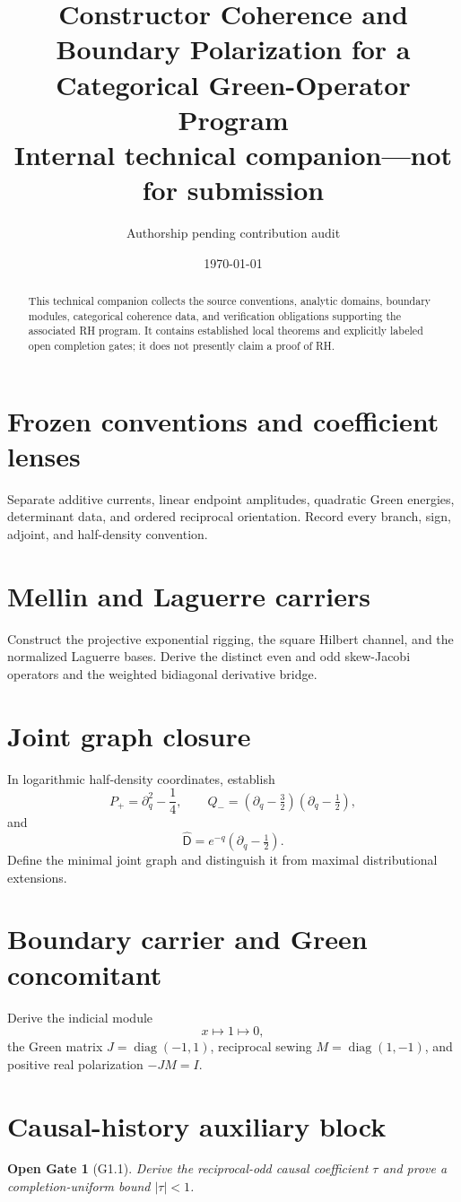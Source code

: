\documentclass[11pt]{article}
\title{Constructor Coherence and Boundary Polarization for a Categorical Green-Operator Program\\
\large Internal technical companion---not for submission}
\author{Authorship pending contribution audit}
\date{\today}
\newtheorem{gate}[theorem]{Open Gate}
\begin{document}
\maketitle
\begin{abstract}
This technical companion collects the source conventions, analytic domains, boundary modules, categorical coherence data, and verification obligations supporting the associated RH program. It contains established local theorems and explicitly labeled open completion gates; it does not presently claim a proof of RH.
\end{abstract}

\section{Frozen conventions and coefficient lenses}
Separate additive currents, linear endpoint amplitudes, quadratic Green energies, determinant data, and ordered reciprocal orientation. Record every branch, sign, adjoint, and half-density convention.

\section{Mellin and Laguerre carriers}
Construct the projective exponential rigging, the square Hilbert channel, and the normalized Laguerre bases. Derive the distinct even and odd skew-Jacobi operators and the weighted bidiagonal derivative bridge.

\section{Joint graph closure}
In logarithmic half-density coordinates, establish
\[
P_+=\partial_q^2-\frac14,\qquad
Q_-=(\partial_q-\tfrac32)(\partial_q-\tfrac12),
\]
and
\[
\widehat{\mathsf D}=e^{-q}(\partial_q-\tfrac12).
\]
Define the minimal joint graph and distinguish it from maximal distributional extensions.

\section{Boundary carrier and Green concomitant}
Derive the indicial module
\[
x\longmapsto1\longmapsto0,
\]
the Green matrix \(J=\operatorname{diag}(-1,1)\), reciprocal sewing \(M=\operatorname{diag}(1,-1)\), and positive real polarization \(-JM=I\).

\section{Causal-history auxiliary block}
\begin{gate}[G1.1]
Derive the reciprocal-odd causal coefficient \(\tau\) and prove a completion-uniform bound \(|\tau|<1\).
\end{gate}
\end{document}
